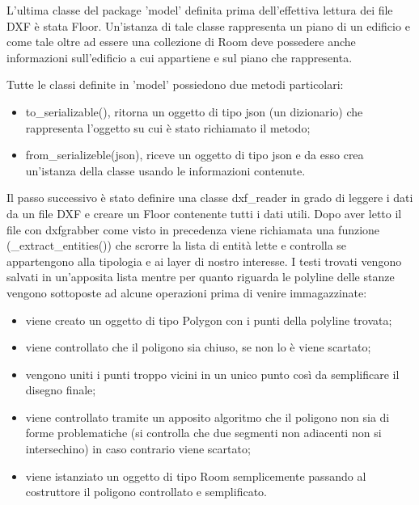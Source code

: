 \documentclass[12pt]{report}
\begin{document}
L'ultima classe del package 'model' definita prima dell'effettiva lettura dei file DXF è stata Floor. Un'istanza di tale classe rappresenta un piano di un edificio e come tale oltre ad essere una collezione di Room deve possedere anche informazioni sull'edificio a cui appartiene e sul piano che rappresenta.

Tutte le classi definite in 'model' possiedono due metodi particolari:
\begin{itemize}
\item to\_serializable(), ritorna un oggetto di tipo json (un dizionario) che rappresenta l'oggetto su cui è stato richiamato il metodo;
\item from\_serializeble(json), riceve un oggetto di tipo json e da esso crea un'istanza della classe usando le informazioni contenute.
\end{itemize}

Il passo successivo è stato definire una classe dxf\_reader in grado di leggere i dati da un file DXF e creare un Floor contenente tutti i dati utili.
Dopo aver letto il file con dxfgrabber come visto in precedenza viene richiamata una funzione (\_extract\_entities()) che scrorre la lista di entità lette e controlla se appartengono alla tipologia e ai layer di nostro interesse.
I testi trovati vengono salvati in un'apposita lista mentre per quanto riguarda le polyline delle stanze vengono sottoposte ad alcune operazioni prima di venire immagazzinate:
\begin{itemize}
\item viene creato un oggetto di tipo Polygon con i punti della polyline trovata;
\item viene controllato che il poligono sia chiuso, se non lo è viene scartato;
\item vengono uniti i punti troppo vicini in un unico punto così da semplificare il disegno finale;
\item viene controllato tramite un apposito algoritmo che il poligono non sia di forme problematiche (si controlla che due segmenti non adiacenti non si intersechino) in caso contrario viene scartato;
\item viene istanziato un oggetto di tipo Room semplicemente passando al costruttore il poligono controllato e semplificato.
\end{itemize}
\end{document}
